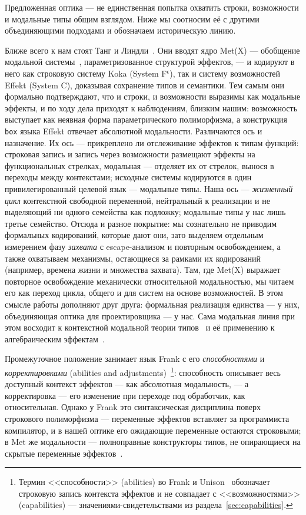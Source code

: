 \documentclass{ProcISPRAS}
\begin{document}
Предложенная оптика --- не единственная попытка охватить строки, возможности и модальные
типы общим взглядом. Ниже мы соотносим её с другими объединяющими подходами и обозначаем
историческую линию.

Ближе всего к нам стоят Танг и Линдли~\cite{tang2026modal}. Они вводят ядро Met(X) ---
обобщение модальной системы~\cite{tang2025modal}, параметризованное структурой эффектов, ---
и кодируют в него как строковую систему Koka (System F$^\epsilon$), так и систему
возможностей Effekt (System C), доказывая сохранение типов и семантики. Тем самым они
формально подтверждают, что и строки, и возможности выразимы как модальные эффекты, и по ходу
дела приходят к наблюдениям, близким нашим: возможность выступает как неявная форма
параметрического полиморфизма, а конструкция \texttt{box} языка Effekt отвечает абсолютной
модальности. Различаются ось и назначение. Их ось --- прикреплено ли
отслеживание эффектов к типам функций: строковая запись и запись через возможности размещают эффекты
на функциональных стрелках, модальная --- отделяет их от стрелок, вынося в переходы
между контекстами; исходные системы кодируются в один привилегированный целевой язык ---
модальные типы. Наша ось --- \emph{жизненный цикл} контекстной свободной переменной,
нейтральный к реализации и не выделяющий ни одного семейства как подложку; модальные типы у нас
лишь третье семейство. Отсюда и разное покрытие: мы сознательно не приводим формальных
кодирований, которые дают они, зато выделяем отдельным измерением фазу \emph{захвата} с
escape-анализом и повторным освобождением, а также охватываем механизмы, остающиеся за
рамками их кодирований (например, времена жизни и множества захвата). Там, где Met(X)
выражает повторное освобождение механически относительной модальностью, мы читаем его
как переход цикла, общего и для систем на основе возможностей. В этом
смысле работы дополняют друг друга: формальная реализация единства --- у них, объединяющая
оптика для проектировщика --- у нас. Сама модальная линия при этом восходит к контекстной
модальной теории типов~\cite{nanevski2008contextual} и её применению к алгебраическим
эффектам~\cite{zyuzin2021contextual}.

Промежуточное положение занимает язык Frank с его \emph{способностями} и
\emph{корректировками} (abilities and adjustments)~\cite{lindley2017do,
convent2020doo}\footnote{Термин <<способности>> (abilities) во Frank и
Unison~\cite{unison-abilities} обозначает строковую запись контекста эффектов и не
совпадает с <<возможностями>> (capabilities) --- значениями-свидетельствами из
раздела~\ref{sec:capabilities}.}:
способность описывает весь доступный контекст эффектов --- как абсолютная модальность, ---
а корректировка --- его изменение при переходе под обработчик, как относительная. Однако
у Frank это синтаксическая дисциплина поверх строкового полиморфизма --- переменные
эффектов вставляет за программиста компилятор, и в нашей оптике его ожидающие переменные
остаются строковыми; в Met же модальности --- полноправные конструкторы типов, не
опирающиеся на скрытые переменные эффектов~\cite{tang2025modal}.
\end{document}
